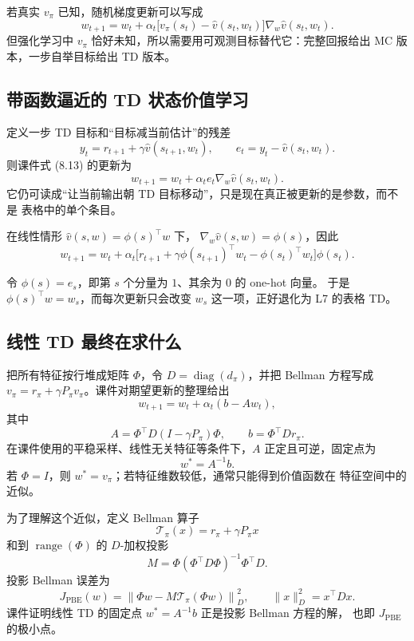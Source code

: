 \documentclass[11pt,a4paper,fontset=fandol]{ctexart}
\begin{document}
若真实 \(v_\pi\) 已知，随机梯度更新可以写成
\[
w_{t+1}
=w_t+\alpha_t
\bigl[v_\pi(s_t)-\hat v(s_t,w_t)\bigr]
\nabla_w\hat v(s_t,w_t).
\]
但强化学习中 \(v_\pi\) 恰好未知，所以需要用可观测目标替代它：完整回报给出 MC
版本，一步自举目标给出 TD 版本。

\subsection{带函数逼近的 TD 状态价值学习}

定义一步 TD 目标和“目标减当前估计”的残差
\[
y_t=r_{t+1}+\gamma\hat v(s_{t+1},w_t),
\qquad
e_t=y_t-\hat v(s_t,w_t).
\]
则课件式 (8.13) 的更新为
\[
\boxed{
w_{t+1}
=w_t+\alpha_t e_t\nabla_w\hat v(s_t,w_t)}.
\]
它仍可读成“让当前输出朝 TD 目标移动”，只是现在真正被更新的是参数，而不是
表格中的单个条目。

在线性情形 \(\hat v(s,w)=\phi(s)^\top w\) 下，
\(\nabla_w\hat v(s,w)=\phi(s)\)，因此
\[
\boxed{
w_{t+1}
=w_t+\alpha_t
\bigl[r_{t+1}+\gamma\phi(s_{t+1})^\top w_t
-\phi(s_t)^\top w_t\bigr]\phi(s_t)}.
\]

\begin{intuitionbox}
令 \(\phi(s)=e_s\)，即第 \(s\) 个分量为 \(1\)、其余为 \(0\) 的 one-hot 向量。
于是 \(\phi(s)^\top w=w_s\)，而每次更新只会改变 \(w_s\) 这一项，正好退化为
L7 的表格 TD。
\end{intuitionbox}

\subsection{线性 TD 最终在求什么}

把所有特征按行堆成矩阵 \(\Phi\)，令
\(D=\operatorname{diag}(d_\pi)\)，并把 Bellman 方程写成
\(v_\pi=r_\pi+\gamma P_\pi v_\pi\)。课件对期望更新的整理给出
\[
w_{t+1}=w_t+\alpha_t(b-Aw_t),
\]
其中
\[
\boxed{
A=\Phi^\top D(I-\gamma P_\pi)\Phi,
\qquad
b=\Phi^\top Dr_\pi}.
\]
在课件使用的平稳采样、线性无关特征等条件下，\(A\) 正定且可逆，固定点为
\[
\boxed{w^*=A^{-1}b}.
\]
若 \(\Phi=I\)，则 \(w^*=v_\pi\)；若特征维数较低，通常只能得到价值函数在
特征空间中的近似。

为了理解这个近似，定义 Bellman 算子
\[
\mathcal T_\pi(x)=r_\pi+\gamma P_\pi x
\]
和到 \(\operatorname{range}(\Phi)\) 的 \(D\)-加权投影
\[
M=\Phi(\Phi^\top D\Phi)^{-1}\Phi^\top D.
\]
投影 Bellman 误差为
\[
J_{\mathrm{PBE}}(w)
=\left\lVert
\Phi w-M\mathcal T_\pi(\Phi w)
\right\rVert_D^2,
\qquad
\|x\|_D^2=x^\top Dx.
\]
课件证明线性 TD 的固定点 \(w^*=A^{-1}b\) 正是投影 Bellman 方程的解，
也即 \(J_{\mathrm{PBE}}\) 的极小点。
\end{document}
